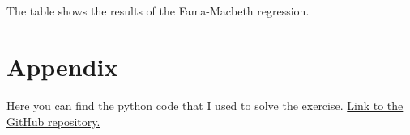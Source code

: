 \documentclass[hidelinks,12pt]{article}
\begin{document}
\FloatBarrier

\section{}
\subsection{}
\begin{table}[htbp]
    \centering
    \caption{The table shows the results of the Fama-Macbeth regression.}
    \resizebox{.9\textwidth}{!}{}
\end{table}




\appendix

\section*{Appendix}

Here you can find the python code that I used to solve the exercise. \href{https://github.com/mortezaaghajanzadeh/BDAP/tree/main/Assignments/Assignment4}{Link to the GitHub repository.}
\end{document}
